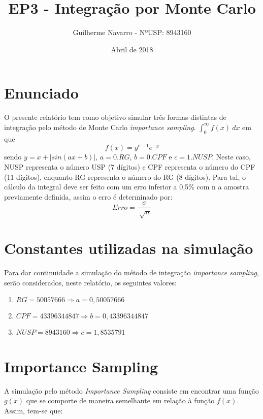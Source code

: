\documentclass{article} %
\begin{document}

\title{EP3 - Integração por Monte Carlo} %
\author{Guilherme Navarro - NºUSP: 8943160} %
\date{Abril de 2018} %

\maketitle

\section{Enunciado}

\qquad O presente relatório tem como objetivo simular três formas distintas de integração pelo método de Monte Carlo {\it{importance sampling}}.  $\int_{0}^{\infty} f(x) \ dx$ em que $$f(x) = y^{c-1}e^{-y}$$ sendo $y = x + |sin(ax+b)|$, $a = 0.RG$, $b = 0.CPF$ e $c = 1.NUSP$. Neste caso, NUSP representa o número USP (7 dígitos) e CPF representa o número do CPF (11 dígitos), enquanto RG representa o número do RG (8 dígitos). Para tal, o cálculo da integral deve ser feito com um erro inferior a 0,5\% com n a amostra previamente definida, assim o erro é determinado por:
$$ Erro = \frac{\sigma}{\sqrt[]{n}} $$
\section{Constantes utilizadas na simulação}

\qquad Para dar continuidade a simulação do método de integração {\it {importance sampling}}, serão considerados, neste relatório, os seguintes valores: 

\begin{enumerate}
\item $RG = 50057666 \Rightarrow a = 0,50057666$
\item $CPF = 43396344847 \Rightarrow b = 0,43396344847$
\item $NUSP = 8943160 \Rightarrow c = 1,8535791$ 

\end{enumerate}

\section{Importance Sampling}

\qquad A simulação pelo método {\it{Importance Sampling}} consiste em encontrar uma função $g(x)$ que se comporte de maneira semelhante em relação à função $f(x)$. Assim, tem-se que:
\end{document}
